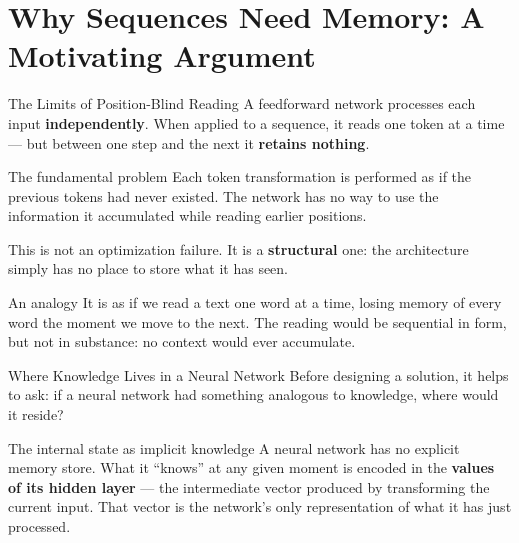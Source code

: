 \documentclass[aspectratio=169]{beamer}
\begin{document}
\section{Why Sequences Need Memory: A Motivating Argument}
%
\begin{frame}{The Limits of Position-Blind Reading}
A feedforward network processes each input \textbf{independently}.
When applied to a sequence, it reads one token at a time ---
but between one step and the next it \textbf{retains nothing}.

\vspace{0.2cm}
\begin{alertblock}{The fundamental problem}
Each token transformation is performed as if the previous tokens
had never existed. The network has no way to use the information
it accumulated while reading earlier positions.
\end{alertblock}

\vspace{0.2cm}
This is not an optimization failure. It is a \textbf{structural} one:
the architecture simply has no place to store what it has seen.

\vspace{0.15cm}
\begin{block}{An analogy}
It is as if we read a text one word at a time, losing memory of
every word the moment we move to the next.
The reading would be sequential in form, but not in substance:
no context would ever accumulate.
\end{block}
\end{frame}
%
%
\begin{frame}{Where Knowledge Lives in a Neural Network}
Before designing a solution, it helps to ask:
if a neural network had something analogous to knowledge,
where would it reside?

\vspace{0.2cm}
\begin{block}{The internal state as implicit knowledge}
A neural network has no explicit memory store.
What it ``knows'' at any given moment is encoded in the
\textbf{values of its hidden layer} --- the intermediate vector
produced by transforming the current input.
That vector is the network's only representation of
what it has just processed.
\end{block}
\end{frame}
%
\end{document}
